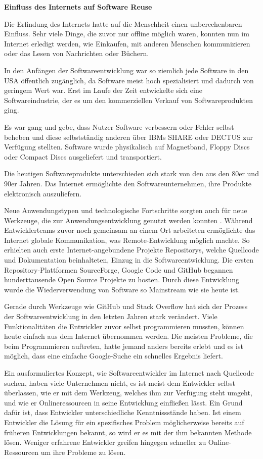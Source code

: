 \documentclass[utf8,biblatex]{lni}
\begin{document}
\textbf{Einfluss des Internets auf Software Reuse}


Die Erfindung des Internets hatte auf die Menschheit einen unberechenbaren Einfluss. Sehr viele Dinge, die zuvor nur offline möglich waren, konnten nun im Internet erledigt werden, wie Einkaufen, mit anderen Menschen kommunizieren oder das Lesen von Nachrichten oder Büchern. 

In den Anfängen der Softwareentwicklung war so ziemlich jede Software in den USA öffentlich zugänglich, da Software meist hoch spezialisiert und dadurch von geringem Wert war. Erst im Laufe der Zeit entwickelte sich eine Softwareindustrie, der es um den kommerziellen Verkauf von Softwareprodukten ging.

Es war gang und gebe, dass Nutzer Software verbessern oder Fehler selbst beheben und diese selbstständig anderen über IBMs SHARE oder DECTUS zur Verfügung stellten. Software wurde physikalisch auf Magnetband, Floppy Discs oder Compact Discs ausgeliefert und transportiert. 

Die heutigen Softwareprodukte unterschieden sich stark von den aus den 80er und 90er Jahren. Das Internet ermöglichte den Softwareunternehmen, ihre Produkte elektronisch auszuliefern. 

Neue Anwendungstypen und technologische Fortschritte sorgten auch für neue Werkzeuge, die zur Anwendungsentwicklung genutzt werden konnten \cite{Wasserman.2011}. Während Entwicklerteams zuvor noch gemeinsam an einem Ort arbeiteten ermöglichte das Internet globale Kommunikation, was Remote-Entwicklung möglich machte. So erhielten auch erste Internet-angebundene Projekte Repositorys, welche Quellcode und Dokumentation beinhalteten, Einzug in die Softwareentwicklung. Die ersten Repository-Plattformen SourceForge, Google Code und GitHub begannen hunderttausende Open Source Projekte zu hosten. Durch diese Entwicklung wurde die Wiederverwendung von Software so Mainstream wie sie heute ist.


Gerade durch Werkzeuge wie GitHub \cite{GitHub.04.11.2022} und Stack Overflow \cite{StackOverflow.04.11.2022} hat sich der Prozess der Softwareentwicklung in den letzten Jahren stark verändert. Viele Funktionalitäten die Entwickler zuvor selbst programmieren mussten, können heute einfach aus dem Internet übernommen werden. Die meisten Probleme, die beim Programmieren auftreten, hatte jemand anders bereits erlebt und es ist möglich, dass eine einfache Google-Suche ein schnelles Ergebnis liefert. 

Ein ausformuliertes Konzept, wie Softwareentwickler im Internet nach Quellcode suchen, haben viele Unternehmen nicht, es ist meist dem Entwickler selbst überlassen, wie er mit dem Werkzeug, welches ihm zur Verfügung steht umgeht, und wie er Onlineressourcen in seine Entwicklung einfließen lässt. Ein Grund dafür ist, dass Entwickler unterschiedliche Kenntnissstände haben. Ist einem Entwickler die Lösung für ein spezifisches Problem möglicherweise bereits auf früheren Entwicklungen bekannt, so wird er es mit der ihm bekannten Methode lösen. Weniger erfahrene Entwickler greifen hingegen schneller zu Online-Ressourcen um ihre Probleme zu lösen. 
\end{document}
